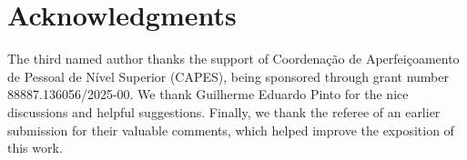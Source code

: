 \documentclass{amsart}
\theoremstyle{definition}
\theoremstyle{remark}
\numberwithin{equation}{section}
\begin{document}
\section*{Acknowledgments}
The third named author thanks the support of Coordenação de Aperfeiçoamento de Pessoal de Nível Superior (CAPES), being sponsored through grant number 88887.136056/2025-00. We thank Guilherme Eduardo Pinto for the nice discussions and helpful suggestions.  Finally,
we thank the referee of an earlier submission for their valuable comments, which
helped improve the exposition of this work.





\end{document}
